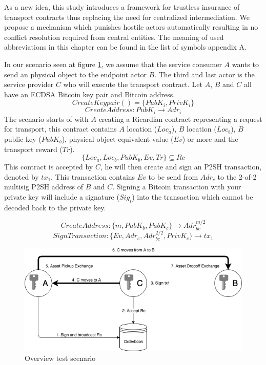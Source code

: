 As a new idea, this study introduces a framework for trustless insurance of transport contracts thus replacing the need for centralized intermediation. We propose a mechanism which punishes hostile actors automatically resulting in no conflict resolution required from central entities. The meaning of used abbreviations in this chapter can be found in the list of symbols appendix A.\par
In our scenario seen at figure \ref{fig:1 main overview}, we assume that the service consumer $A$ wants to send an physical object to the endpoint actor $B$. The third and last actor is the service provider $C$ who will execute the transport contract. Let $A$, $B$ and $C$ all have an ECDSA Bitcoin key pair and Bitcoin address.
\[CreateKeypair() = \{PubK_i, PrivK_i\}\]
\[CreateAddress \colon PubK_i \rightarrow Adr_i\]
The scenario starts of with $A$ creating a Ricardian contract representing a request for transport, this contract contains $A$ location ($Loc_a$), $B$ location ($Loc_b$), $B$ public key ($PubK_b$), physical object equivalent value ($Ev$) or more and the transport reward ($Tr$).
\[\{Loc_a, Loc_b, PubK_b, Ev, Tr\} \subseteq Rc\]
This contract is accepted by $C$, he will then create and sign an P2SH transaction, denoted by $tx_1$. This transaction contains $Ev$ to be send from $Adr_c$ to the 2-of-2 multisig P2SH address of $B$ and $C$. Signing a Bitcoin transaction with your private key will include a signature ($Sig_i$) into the transaction which cannot be decoded back to the private key.

\[CreateAddress \colon \{m, PubK_b, PubK_c\} \rightarrow Adr_{bc}^{m/2}\]
\[SignTransaction \colon \{Ev, Adr_c, Adr_{bc}^{2/2}, PrivK_c\} \rightarrow tx_1\]

\begin{figure}[h]
\centering
\includegraphics[width=1\textwidth]{images/main.png}
\caption{Overview test scenario}
\label{fig:1 main overview}
\end{figure}

